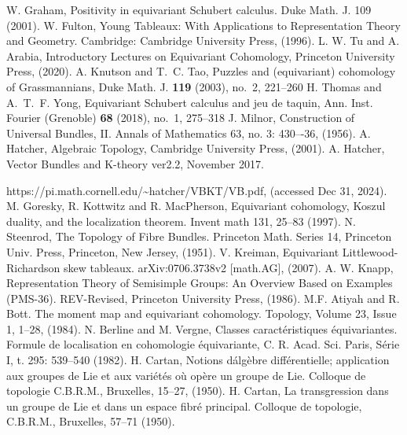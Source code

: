 \begin{thebibliography}{99}
  
   W. Graham, Positivity in equivariant Schubert calculus. Duke Math. J. 109 (2001).
   W. Fulton, Young Tableaux: With Applications to Representation Theory and Geometry. Cambridge: Cambridge University Press, (1996).
   L. W. Tu and A. Arabia, Introductory Lectures on Equivariant Cohomology, Princeton University Press, (2020).
   A. Knutson and T.~C. Tao, Puzzles and (equivariant) cohomology of Grassmannians, Duke Math. J. {\bf 119} (2003), no.~2, 221--260 
   H. Thomas and A.~T.~F. Yong, Equivariant Schubert calculus and jeu de taquin, Ann. Inst. Fourier (Grenoble) {\bf 68} (2018), no.~1, 275--318
   J. Milnor, Construction of Universal Bundles, II. Annals of Mathematics 63, no. 3: 430–-36, (1956).
   A. Hatcher, Algebraic Topology, Cambridge University Press, (2001).
   A. Hatcher, Vector Bundles and K-theory ver2.2, November 2017. 
  
  https://pi.math.cornell.edu/\textasciitilde hatcher/VBKT/VB.pdf, (accessed Dec 31, 2024).
   M. Goresky, R. Kottwitz and R. MacPherson, Equivariant cohomology, Koszul duality, and the localization theorem. Invent math 131, 25--83 (1997).
   N. Steenrod, The Topology of Fibre Bundles. Princeton Math. Series 14,
  Princeton Univ. Press, Princeton, New Jersey, (1951).
   V. Kreiman, Equivariant Littlewood-Richardson skew tableaux. arXiv:0706.3738v2 [math.AG], (2007).
   A. W. Knapp, Representation Theory of Semisimple Groups: An Overview Based on Examples (PMS-36). REV-Revised, Princeton University Press, (1986). 
   M.F. Atiyah and R. Bott.
  The moment map and equivariant cohomology.
  Topology,
  Volume 23, Issue 1, 1--28, (1984).
   N. Berline and M. Vergne, Classes caract\'eristiques \'equivariantes. Formule
  de localisation en cohomologie \'equivariante, C. R. Acad. Sci. Paris, S\'erie
  I, t. 295: 539--540 (1982).
  H. Cartan, Notions d\'alg\`ebre diff\' erentielle; application aux groupes de Lie et aux vari\'et\' es o\`u op\`ere un
  groupe de Lie. Colloque de topologie C.B.R.M., Bruxelles, 15--27, (1950).
  H. Cartan, La transgression dans un groupe de Lie et dans un espace fibr\'e principal. Colloque de
  topologie, C.B.R.M., Bruxelles, 57--71 (1950).
\end{thebibliography}